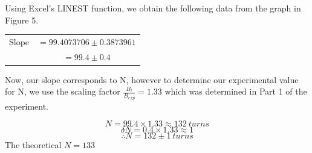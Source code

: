\documentclass[letterpaper]{article}
\begin{document}
\newpage
\noindent Using Excel's LINEST function, we obtain the following data from the graph in Figure 5.
\begin{table}[H]
\centering
\begin{tabular}{cc}
  Slope &  $=99.4073706 \pm 0.3873961 $ \\
        &  $=99.4 \pm 0.4$
\end{tabular}
\end{table}

Now, our slope corresponds to N, however to determine our experimental
value for N, we use the scaling factor $\frac{B_t}{B_{exp}}=1.33$ which was
determined in Part 1 of the experiment.

$$ N= 99.4 \times 1.33 \approx 132 \:turns $$
$$ \delta N   = 0.4 \times 1.33 \approx 1 $$
$$ \therefore N = 132 \pm 1 \:turns$$
The theoretical $N=133$
\end{document}
